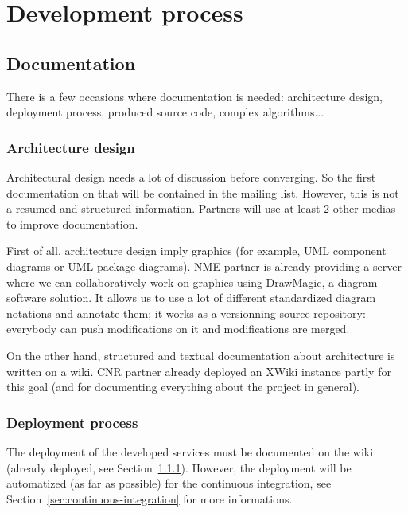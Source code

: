 \chapter{Development process}
\label{ch:development-process}

\section{Documentation}
\label{sec:documentation}

There is a few occasions where documentation is needed: architecture design, deployment process, produced source code, complex algorithms...

\subsection{Architecture design}
\label{sec:architecture-design}

Architectural design needs a lot of discussion before converging.
So the first documentation on that will be contained in the mailing list.
However, this is not a resumed and structured information.
Partners will use at least 2 other medias to improve documentation.

First of all, architecture design imply graphics (for example, UML component diagrams or UML package diagrams).
NME partner is already providing a server where we can collaboratively work on graphics using DrawMagic, a diagram software solution.
It allows us to use a lot of different standardized diagram notations and annotate them; it works as a versionning source repository: everybody can push modifications on it and modifications are merged.

On the other hand, structured and textual documentation about architecture is written on a wiki.
CNR partner already deployed an XWiki instance partly for this goal (and for documenting everything about the \learnpad project in general).

\subsection{Deployment process}
\label{sec:deployment-process}

The deployment of the developed services must be documented on the wiki (already deployed, see Section~\ref{sec:architecture-design}).
However, the deployment will be automatized (as far as possible) for the continuous integration, see Section~\ref{sec:continuous-integration} for more informations.


